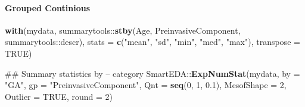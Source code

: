 \documentclass[
]{article}
\newenvironment{Shaded}{\begin{snugshade}}{\end{snugshade}}
\newcommand{\CommentTok}[1]{\textcolor[rgb]{0.54,0.53,0.53}{#1}}
\newcommand{\DataTypeTok}[1]{\textcolor[rgb]{0.00,0.34,0.68}{#1}}
\newcommand{\DecValTok}[1]{\textcolor[rgb]{0.69,0.50,0.00}{#1}}
\newcommand{\FloatTok}[1]{\textcolor[rgb]{0.69,0.50,0.00}{#1}}
\newcommand{\KeywordTok}[1]{\textcolor[rgb]{0.12,0.11,0.11}{\textbf{#1}}}
\newcommand{\NormalTok}[1]{\textcolor[rgb]{0.12,0.11,0.11}{#1}}
\newcommand{\OperatorTok}[1]{\textcolor[rgb]{0.12,0.11,0.11}{#1}}
\newcommand{\OtherTok}[1]{\textcolor[rgb]{0.00,0.43,0.16}{#1}}
\newcommand{\StringTok}[1]{\textcolor[rgb]{0.75,0.01,0.01}{#1}}
\begin{document}
\hypertarget{grouped-continious}{%
\paragraph{Grouped Continious}\label{grouped-continious}}

\begin{Shaded}
\end{Shaded}

\begin{Shaded}
\begin{Highlighting}[]
\KeywordTok{with}\NormalTok{(mydata, summarytools}\OperatorTok{::}\KeywordTok{stby}\NormalTok{(Age, PreinvasiveComponent, summarytools}\OperatorTok{::}\NormalTok{descr), }
    \DataTypeTok{stats =} \KeywordTok{c}\NormalTok{(}\StringTok{"mean"}\NormalTok{, }\StringTok{"sd"}\NormalTok{, }\StringTok{"min"}\NormalTok{, }\StringTok{"med"}\NormalTok{, }\StringTok{"max"}\NormalTok{), }\DataTypeTok{transpose =} \OtherTok{TRUE}\NormalTok{)}
\end{Highlighting}
\end{Shaded}

\begin{Shaded}
\end{Shaded}

\begin{Shaded}
\begin{Highlighting}[]
\CommentTok{## Summary statistics by – category}
\NormalTok{SmartEDA}\OperatorTok{::}\KeywordTok{ExpNumStat}\NormalTok{(mydata, }\DataTypeTok{by =} \StringTok{"GA"}\NormalTok{, }\DataTypeTok{gp =} \StringTok{"PreinvasiveComponent"}\NormalTok{, }\DataTypeTok{Qnt =} \KeywordTok{seq}\NormalTok{(}\DecValTok{0}\NormalTok{, }
    \DecValTok{1}\NormalTok{, }\FloatTok{0.1}\NormalTok{), }\DataTypeTok{MesofShape =} \DecValTok{2}\NormalTok{, }\DataTypeTok{Outlier =} \OtherTok{TRUE}\NormalTok{, }\DataTypeTok{round =} \DecValTok{2}\NormalTok{)}
\end{Highlighting}
\end{Shaded}
\end{document}
